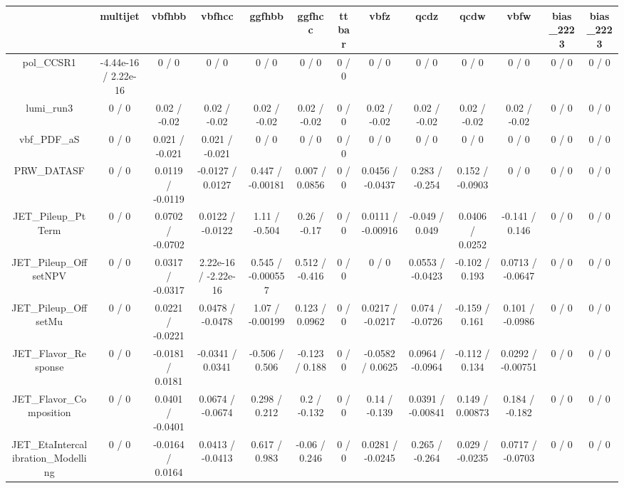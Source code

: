 \documentclass[10pt]{article}
\begin{document}
\begin{table}[htbp]
\begin{center}
\begin{tabular}{|c|c|c|c|c|c|c|c|c|c|c|c|c|}
\hline 
      & multijet      & vbfhbb      & vbfhcc      & ggfhbb      & ggfhcc      & ttbar      & vbfz      & qcdz      & qcdw      & vbfw      & bias_2223      & bias_2223 \\ 
\hline 
  pol_CCSR1 & -4.44e-16 / 2.22e-16 & 0 / 0 & 0 / 0 & 0 / 0 & 0 / 0 & 0 / 0 & 0 / 0 & 0 / 0 & 0 / 0 & 0 / 0 & 0 / 0 & 0 / 0 \\ 
  lumi_run3 & 0 / 0 & 0.02 / -0.02 & 0.02 / -0.02 & 0.02 / -0.02 & 0.02 / -0.02 & 0 / 0 & 0.02 / -0.02 & 0.02 / -0.02 & 0.02 / -0.02 & 0.02 / -0.02 & 0 / 0 & 0 / 0 \\ 
  vbf_PDF_aS & 0 / 0 & 0.021 / -0.021 & 0.021 / -0.021 & 0 / 0 & 0 / 0 & 0 / 0 & 0 / 0 & 0 / 0 & 0 / 0 & 0 / 0 & 0 / 0 & 0 / 0 \\ 
  PRW_DATASF & 0 / 0 & 0.0119 / -0.0119 & -0.0127 / 0.0127 & 0.447 / -0.00181 & 0.007 / 0.0856 & 0 / 0 & 0.0456 / -0.0437 & 0.283 / -0.254 & 0.152 / -0.0903 & 0 / 0 & 0 / 0 & 0 / 0 \\ 
  JET_Pileup_PtTerm & 0 / 0 & 0.0702 / -0.0702 & 0.0122 / -0.0122 & 1.11 / -0.504 & 0.26 / -0.17 & 0 / 0 & 0.0111 / -0.00916 & -0.049 / 0.049 & 0.0406 / 0.0252 & -0.141 / 0.146 & 0 / 0 & 0 / 0 \\ 
  JET_Pileup_OffsetNPV & 0 / 0 & 0.0317 / -0.0317 & 2.22e-16 / -2.22e-16 & 0.545 / -0.000557 & 0.512 / -0.416 & 0 / 0 & 0 / 0 & 0.0553 / -0.0423 & -0.102 / 0.193 & 0.0713 / -0.0647 & 0 / 0 & 0 / 0 \\ 
  JET_Pileup_OffsetMu & 0 / 0 & 0.0221 / -0.0221 & 0.0478 / -0.0478 & 1.07 / -0.00199 & 0.123 / 0.0962 & 0 / 0 & 0.0217 / -0.0217 & 0.074 / -0.0726 & -0.159 / 0.161 & 0.101 / -0.0986 & 0 / 0 & 0 / 0 \\ 
  JET_Flavor_Response & 0 / 0 & -0.0181 / 0.0181 & -0.0341 / 0.0341 & -0.506 / 0.506 & -0.123 / 0.188 & 0 / 0 & -0.0582 / 0.0625 & 0.0964 / -0.0964 & -0.112 / 0.134 & 0.0292 / -0.00751 & 0 / 0 & 0 / 0 \\ 
  JET_Flavor_Composition & 0 / 0 & 0.0401 / -0.0401 & 0.0674 / -0.0674 & 0.298 / 0.212 & 0.2 / -0.132 & 0 / 0 & 0.14 / -0.139 & 0.0391 / -0.00841 & 0.149 / 0.00873 & 0.184 / -0.182 & 0 / 0 & 0 / 0 \\ 
  JET_EtaIntercalibration_Modelling & 0 / 0 & -0.0164 / 0.0164 & 0.0413 / -0.0413 & 0.617 / 0.983 & -0.06 / 0.246 & 0 / 0 & 0.0281 / -0.0245 & 0.265 / -0.264 & 0.029 / -0.0235 & 0.0717 / -0.0703 & 0 / 0 & 0 / 0 \\ 

\end{tabular}
\end{center}
\end{table}
\end{document}
